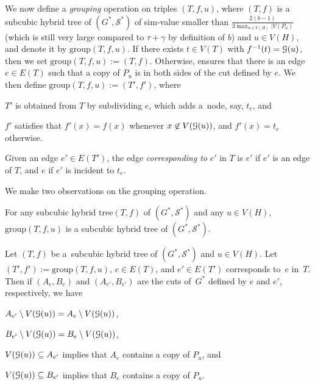 \documentclass[a4paper,UKenglish,cleveref,hyperref,autoref]{lipics-v2021}
\newcommand{\htree}{hybrid tree\xspace}
\begin{document}
\newcommand{\group}{\text{group}}

We now define a \emph{grouping} operation on triples $(T, f, u)$, where $(T, f)$ is a subcubic \htree of $(G^*, \mathcal S^*)$ of sim-value smaller than $\frac{2(b-1)}{3\max_{u \in V(H)}|V(P_u)}$ (which is still very large compared to $\tau + \gamma$ by definition of $b$) and $u \in V(H)$, and denote it by $\group(T, f, u)$.
If there exists $t \in V(T)$ with $f^{-1}(t) = \mathcal G(u)$, then we set $\group(T, f, u) := (T, f)$.
Otherwise,  ensures that there is an edge $e \in E(T)$ such that a copy of $P_u$ is in both sides of the cut defined by $e$.
We then define $\group(T, f, u) := (T', f')$, where
\begin{compactitem}
  \item $T'$ is obtained from $T$ by subdividing $e$, which adds a~node, say, $t_e$, and
  \item $f'$ satisfies that $f'(x) = f(x)$ whenever $x \not \in V(\mathcal G(u))$, and $f'(x) = t_e$ otherwise.
\end{compactitem}
Given an edge $e' \in E(T')$, the edge \emph{corresponding to} $e'$ in $T$ is $e'$ if $e'$ is an edge of $T$, and $e$ if $e'$ is incident to $t_e$.

We make two observations on the grouping operation.

\begin{observation}\label{obs:subcubic}
For any subcubic \htree $(T, f)$ of $(G^*, \mathcal S^*)$ and any $u \in V(H)$, $\group(T, f, u)$ is a subcubic \htree of $(G^*, \mathcal S^*)$. 
\end{observation}

\begin{observation}\label{rmk:corresponding-cuts}
Let $(T, f)$ be a~subcubic \htree of $(G^*, \mathcal S^*)$ and $u \in V(H)$.
Let $(T', f') := \group(T, f, u)$, $e \in E(T)$, and $e' \in E(T')$ corresponds to~$e$ in~$T$.
Then if $(A_e, B_e)$ and $(A_{e'}, B_{e'})$ are the cuts of~$G^*$ defined by $e$ and $e'$, respectively, we have
\begin{compactitem}
	\item $A_{e'} \setminus V(\mathcal G(u)) = A_e \setminus V(\mathcal G(u))$, 
	\item $B_{e'} \setminus V(\mathcal G(u)) = B_e \setminus V(\mathcal G(u))$, 
	\item $V(\mathcal G(u)) \subseteq A_{e'}$ implies that $A_e$ contains a copy of $P_u$, and 
        \item $V(\mathcal G(u)) \subseteq B_{e'}$ implies that $B_e$ contains a copy of $P_u$.
\end{compactitem}
\end{observation}
\end{document}
